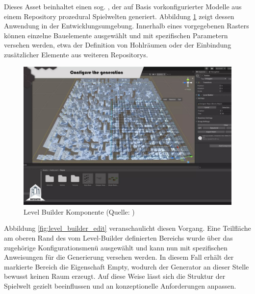 Dieses Asset beinhaltet einen sog. , der auf Basis vorkonfigurierter Modelle aus einem Repository prozedural Spielwelten generiert. Abbildung \ref{fig:level_builder} zeigt dessen Anwendung in der Entwicklungsumgebung. Innerhalb eines vorgegebenen Rasters können einzelne Bauelemente ausgewählt und mit spezifischen Parametern versehen werden, etwa der Definition von Hohlräumen oder der Einbindung zusätzlicher Elemente aus weiteren Repositorys.

\begin{figure}[ht]
\centering
\includegraphics[width=1\linewidth]{content/pictures/FirstSteps00.png}
\caption{Level Builder Komponente (Quelle: \citealp{alasl_autolevel_2022})}
\label{fig:level_builder}
\end{figure}

Abbildung \ref{fig:level_builder_edit} veranschaulicht diesen Vorgang. Eine Teilfläche am oberen Rand des vom Level-Builder definierten Bereichs wurde über das zugehörige Konfigurationsmenü ausgewählt und kann nun mit spezifischen Anweisungen für die Generierung versehen werden. In diesem Fall erhält der markierte Bereich die Eigenschaft Empty, wodurch der Generator an dieser Stelle bewusst keinen Raum erzeugt. Auf diese Weise lässt sich die Struktur der Spielwelt gezielt beeinflussen und an konzeptionelle Anforderungen anpassen.

